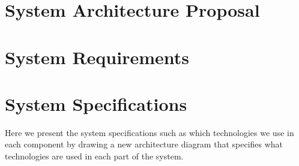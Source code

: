 \documentclass[
  oneside,
  11pt, a4paper,
  footinclude=true,
  headinclude=true,
  cleardoublepage=empty
]{scrbook}
\begin{document}
	\chapter{System Architecture Proposal}
	
	
	\chapter{System Requirements}
	
	
	\chapter{System Specifications}
	Here we present the system specifications such as which technologies we use in each component by drawing a new architecture diagram that specifies what technologies are used in each part of the system.
	

			
	\cleardoublepage

	
\end{document}
